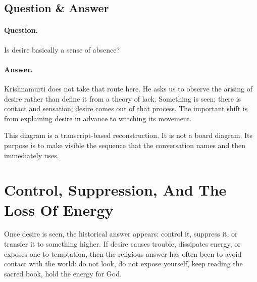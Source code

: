 \subsection{Question \& Answer}

\paragraph{Question.}
Is desire basically a sense of absence?

\paragraph{Answer.}
Krishnamurti does not take that route here. He asks us to observe the arising of desire rather than define it from a theory of lack. Something is seen; there is contact and sensation; desire comes out of that process. The important shift is from explaining desire in advance to watching its movement.

\begin{figure}
\centering
{}
\end{figure}

This diagram is a transcript-based reconstruction. It is not a board diagram. Its purpose is to make visible the sequence that the conversation names and then immediately uses.

\section{Control, Suppression, And The Loss Of Energy}

Once desire is seen, the historical answer appears: control it, suppress it, or transfer it to something higher. If desire causes trouble, dissipates energy, or exposes one to temptation, then the religious answer has often been to avoid contact with the world: do not look, do not expose yourself, keep reading the sacred book, hold the energy for God.


